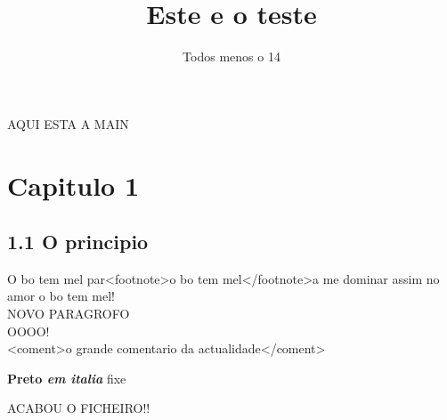 \documentclass[11pt, a4paper, oneside]{article}
\begin{document}
AQUI ESTA A MAIN 





\title{Este e o teste
}
\author{Todos menos o 14
}

\maketitle


\section{Capitulo 1
}\subsection{1.1 O principio
}O bo tem mel par<footnote>o bo tem mel</footnote>a me dominar assim no amor o bo tem mel!\\
 NOVO PARAGROFO\\
OOOO!\\


<coment>o grande comentario da actualidade</coment>

\textbf{Preto \textit{em italia}} fixe

ACABOU O FICHEIRO!!
\end{document}
